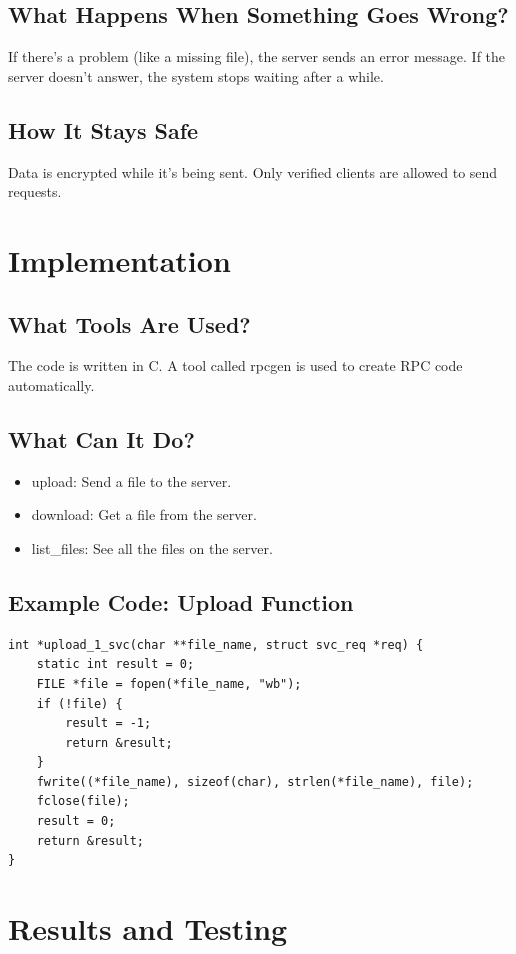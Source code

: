 \documentclass[a4paper,12pt]{article}
\begin{document}
\subsection{What Happens When Something Goes Wrong?}
If there’s a problem (like a missing file), the server sends an error message. If the server doesn’t answer, the system stops waiting after a while.

\subsection{How It Stays Safe}
Data is encrypted while it’s being sent. Only verified clients are allowed to send requests.

\section{Implementation}
\subsection{What Tools Are Used?}
The code is written in C. A tool called rpcgen is used to create RPC code automatically.

\subsection{What Can It Do?}
\begin{itemize}
    \item upload: Send a file to the server.
    \item download: Get a file from the server.
    \item list\_files: See all the files on the server.
\end{itemize}

\subsection{Example Code: Upload Function}
\begin{verbatim}
int *upload_1_svc(char **file_name, struct svc_req *req) {  
    static int result = 0;  
    FILE *file = fopen(*file_name, "wb");  
    if (!file) {  
        result = -1;  
        return &result;  
    }  
    fwrite((*file_name), sizeof(char), strlen(*file_name), file);  
    fclose(file);  
    result = 0;  
    return &result;  
}
\end{verbatim}

\section{Results and Testing}
\end{document}
